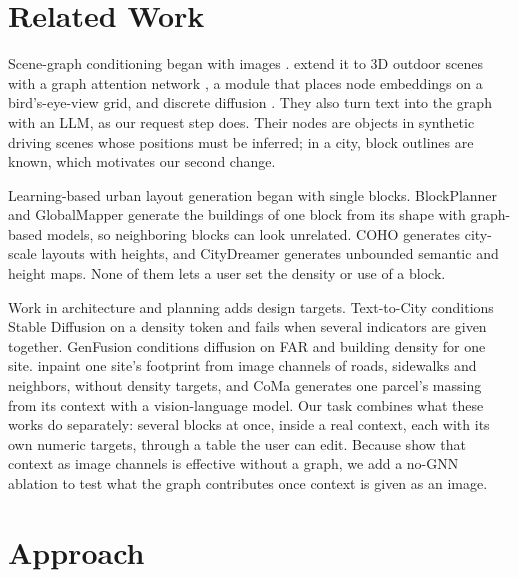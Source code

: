 \documentclass[twocolumn,11pt]{article}
\begin{document}
\section{Related Work}
Scene-graph conditioning began with images \citep{johnson2018sg2im}. \citet{liu2025controllable} extend it to 3D outdoor scenes with a graph attention network \citep{velickovic2018gat}, a module that places node embeddings on a bird's-eye-view grid, and discrete diffusion \citep{hoogeboom2021argmax,austin2021d3pm}. They also turn text into the graph with an LLM, as our request step does. Their nodes are objects in synthetic driving scenes whose positions must be inferred; in a city, block outlines are known, which motivates our second change.

Learning-based urban layout generation began with single blocks. BlockPlanner \citep{xu2021blockplanner} and GlobalMapper \citep{he2023globalmapper} generate the buildings of one block from its shape with graph-based models, so neighboring blocks can look unrelated. COHO \citep{he2024coho} generates city-scale layouts with heights, and CityDreamer \citep{xie2024citydreamer} generates unbounded semantic and height maps. None of them lets a user set the density or use of a block.

Work in architecture and planning adds design targets. Text-to-City \citep{zhuang2024texttocity} conditions Stable Diffusion on a density token and fails when several indicators are given together. GenFusion \citep{gao2025genfusion} conditions diffusion on FAR and building density for one site. \citet{jang2026context} inpaint one site's footprint from image channels of roads, sidewalks and neighbors, without density targets, and CoMa \citep{maslov2026coma} generates one parcel's massing from its context with a vision-language model. Our task combines what these works do separately: several blocks at once, inside a real context, each with its own numeric targets, through a table the user can edit. Because \citet{jang2026context} show that context as image channels is effective without a graph, we add a no-GNN ablation to test what the graph contributes once context is given as an image.

\section{Approach}
\end{document}
